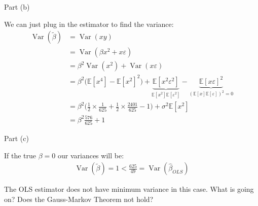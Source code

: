 \begin{frame}{Part (b)}

    We can just plug in the estimator to find the variance:
    \begin{align*}
        \operatorname{Var}(\tilde{\beta}) &= \operatorname{Var}(xy)
        \\
        &= \operatorname{Var}(\beta x^2 + x \varepsilon)
        \\
        &= \beta^2 \operatorname{Var}(x^2) + \operatorname{Var}(x \varepsilon)
        \\
        &= \beta^2 \Biggr( \mathbb{E} [x^4] - \mathbb{E}[x^2]^2 \Biggr) + \underbrace{\mathbb{E}[x^2 \varepsilon^2]}_{\mathbb{E}[x^2] \mathbb{E}[\varepsilon^2]} - \underbrace{\mathbb{E}[x \varepsilon]^2}_{(\mathbb{E}[x] \mathbb{E}[\varepsilon])^2=0}
        \\
        &= \beta^2 \Biggr( \frac{1}{2} \times \frac{1}{625} + \frac{1}{2} \times \frac{2401}{625} - 1 \Biggr) + \sigma^2 \mathbb{E} [ x^2]
        \\
        &= \beta^2 \frac{576}{625} + 1
    \end{align*}
    
\end{frame}


\begin{frame}{Part (c)}

    If the true $\beta = 0$ our variances will be:
    \begin{align*}
        \operatorname{Var}(\tilde{\beta}) = 1 < \frac{625}{49} = \operatorname{Var}(\hat{\beta}_{OLS})
    \end{align*}

    The OLS estimator does not have minimum variance in this case. What is going on? Does the Gauss-Markov Theorem not hold?
    
\end{frame}